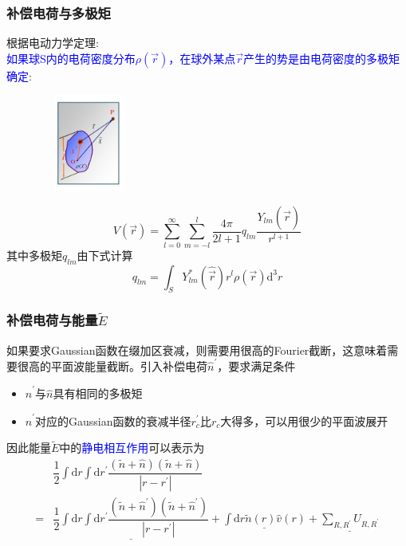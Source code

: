 \frame
{
\frametitle{补偿电荷与多极矩}
根据电动力学定理:\\\textcolor{blue}{如果球\textrm{S}内的电荷密度分布$\rho(\vec r)$，在球外某点$\vec r$产生的势是由电荷密度的多极矩确定}:
\begin{figure}[h!]
\vspace*{-15pt}
\centering
\includegraphics[height=1.25in,width=1.32in,viewport=1 22 507 575,clip]{Figures/potential_multipole.jpg}
\label{Potential-multipole}
\end{figure}
\begin{displaymath}
	V(\vec r)=\sum_{l=0}^{\infty}\sum_{m=-l}^{l}\dfrac{4\pi}{2l+1}q_{lm}\dfrac{Y_{lm}(\hat{\vec r})}{r^{l+1}}
\end{displaymath}
其中多极矩$q_{lm}$由下式计算
\begin{displaymath}
	q_{lm}=\int_SY_{lm}^{\ast}(\hat{\vec r})r^l\rho(\vec r)\mathrm{d}^3r
\end{displaymath}
}

\frame
{
	\frametitle{补偿电荷与能量$\tilde E$}
	如果要求\textrm{Gaussian}函数在缀加区衰减，则需要用很高的\textrm{Fourier}截断，这意味着需要很高的平面波能量截断。引入补偿电荷$\hat n^{\prime}$，要求满足条件
	\begin{itemize}
		\item $\hat n^{\prime}$与$\hat n$具有相同的多极矩
		\item $\hat n^{\prime}$对应的\textrm{Gaussian}函数的衰减半径$r_c^{\prime}$比$r_c$大得多，可以用很少的平面波展开
	\end{itemize}
	因此能量$\tilde E$中的\textcolor{blue}{静电相互作用}可以表示为
	\begin{displaymath}
		\begin{aligned}
			&\dfrac12\int\mathrm{d}r\int\mathrm{d}r^{\prime}\dfrac{(\tilde n+\hat n)(\tilde n+\hat n)}{|r-r^{\prime}|}\\
			=&\underline{\dfrac12\int\mathrm{d}r\int\mathrm{d}r^{\prime}\dfrac{(\tilde n+\hat n^{\prime})(\tilde n+\hat n^{\prime})}{|r-r^{\prime}|}}
			+\underline{\int\mathrm{d}r\tilde n(r)\hat v(r)}+\underline{\sum_{R,R^{\prime}}U_{R,R^{\prime}}}
		\end{aligned}
	\end{displaymath}
}

